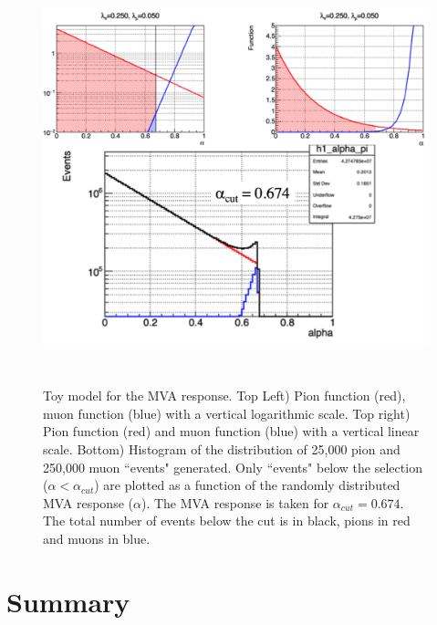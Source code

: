 \documentclass[12pt]{article}
\begin{document}
\begin{figure}[tbph]
\begin{center}
\includegraphics[height=12cm,clip=true]{toy_systematics_c1}
\caption{Toy model for the MVA response. Top Left) Pion function (red), muon function (blue) with a vertical logarithmic scale. 
Top right) Pion function (red) and muon function (blue) with a vertical linear scale.
Bottom) Histogram of the distribution of 25,000 pion and 250,000 muon ``events" generated. Only ``events" below the selection ($\alpha < \alpha_{cut}$) 
are plotted as a function of the randomly distributed MVA response ($\alpha$). The MVA response is taken for $\alpha_{cut}=0.674$. 
The total number of events below the cut is in black, pions in red and muons in blue.
\label{fig:toy_systematics_c1}}
\end{center}
\end{figure} 

\section{Summary}





\end{document}
